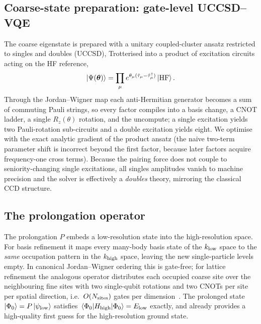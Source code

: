 \documentclass[11pt]{article}
\newcommand{\Hhigh}{H_{\mathrm{high}}}
\begin{document}
\subsection{Coarse-state preparation: gate-level UCCSD--VQE}
\label{sec:uccsd}
The coarse eigenstate is prepared with a unitary coupled-cluster ansatz restricted
to singles and doubles (UCCSD), Trotterised into a product of excitation circuits
acting on the HF reference,
\begin{equation}
  \ket{\Psi(\boldsymbol\theta)}
  =\prod_{\mu} e^{\theta_\mu(\hat\tau_\mu-\hat\tau_\mu^\dagger)}\ket{\rm HF}.
\end{equation}
Through the Jordan--Wigner map each anti-Hermitian generator becomes a sum of
commuting Pauli strings, so every factor compiles into a basis change, a CNOT ladder,
a single $R_z(\theta)$ rotation, and the uncompute; a single excitation yields two
Pauli-rotation sub-circuits and a double excitation yields eight.  We optimise with
the exact analytic gradient of the product ansatz (the naive two-term parameter shift
is incorrect beyond the first factor, because later factors acquire frequency-one
cross terms).  Because the pairing force does not couple to seniority-changing
single excitations, all singles amplitudes vanish to machine precision and the
solver is effectively a \emph{doubles} theory, mirroring the classical CCD structure.

\subsection{The prolongation operator}
The prolongation $P$ embeds a low-resolution state into the high-resolution space.
For basis refinement it maps every many-body basis state of the $k_{\rm low}$ space to
the \emph{same} occupation pattern in the $k_{\rm high}$ space, leaving the new
single-particle levels empty.  In canonical Jordan--Wigner ordering this is
gate-free; for lattice refinement the analogous operator distributes each occupied
coarse site over the neighbouring fine sites with two single-qubit rotations and two
CNOTs per site per spatial direction, i.e.\ $O(N_{\rm sites})$ gates per
dimension~\cite{Bogner2026}.  The prolonged state $\ket{\Phi_0}=P\ket{\psi_{\rm low}}$
satisfies $\expval{\Hhigh}{\Phi_0}=E_{\rm low}$ exactly, and already provides a
high-quality first guess for the high-resolution ground state.
\end{document}
